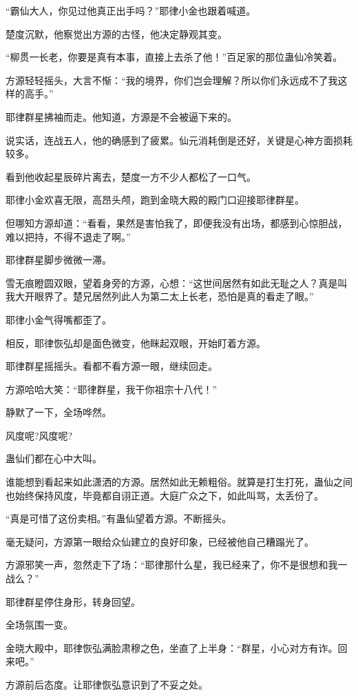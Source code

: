 \begin{this_body}
“霸仙大人，你见过他真正出手吗？”耶律小金也跟着喊道。

楚度沉默，他察觉出方源的古怪，他决定静观其变。

“柳贯一长老，你要是真有本事，直接上去杀了他！”百足家的那位蛊仙冷笑着。

方源轻轻摇头，大言不惭：“我的境界，你们岂会理解？所以你们永远成不了我这样的高手。”

耶律群星拂袖而走。他知道，方源是不会被逼下来的。

说实话，连战五人，他的确感到了疲累。仙元消耗倒是还好，关键是心神方面损耗较多。

看到他收起星辰碎片离去，楚度一方不少人都松了一口气。

耶律小金欢喜无限，高昂头颅，跑到金晓大殿的殿门口迎接耶律群星。

但哪知方源却道：“看看，果然是害怕我了，即便我没有出场，都感到心惊胆战，难以把持，不得不退走了啊。”

耶律群星脚步微微一滞。

雪无痕瞪圆双眼，望着身旁的方源，心想：“这世间居然有如此无耻之人？真是叫我大开眼界了。楚兄居然列此人为第二太上长老，恐怕是真的看走了眼。”

耶律小金气得嘴都歪了。

相反，耶律恢弘却是面色微变，他眯起双眼，开始盯着方源。

耶律群星摇摇头。看都不看方源一眼，继续回走。

方源哈哈大笑：“耶律群星，我干你祖宗十八代！”

静默了一下，全场哗然。

风度呢?风度呢?

蛊仙们都在心中大叫。

谁能想到看起来如此潇洒的方源。居然如此无赖粗俗。就算是打生打死，蛊仙之间也始终保持风度，毕竟都自诩正道。大庭广众之下，如此叫骂，太丢份了。

“真是可惜了这份卖相。”有蛊仙望着方源。不断摇头。

毫无疑问，方源第一眼给众仙建立的良好印象，已经被他自己糟蹋光了。

方源邪笑一声，忽然走下了场：“耶律那什么星，我已经来了，你不是很想和我一战么？”

耶律群星停住身形，转身回望。

全场氛围一变。

金晓大殿中，耶律恢弘满脸肃穆之色，坐直了上半身：“群星，小心对方有诈。回来吧。”

方源前后态度。让耶律恢弘意识到了不妥之处。


\end{this_body}
